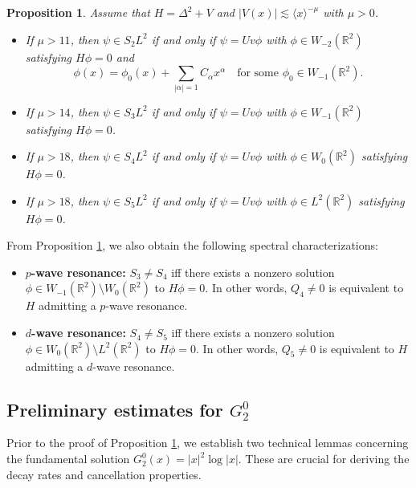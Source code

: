 \documentclass[reqno]{amsart}
\newtheorem{proposition}[theorem]{Proposition}
\numberwithin{equation}{section}
\begin{document}
\begin{proposition}\label{characterizations-1}
	Assume that $H = \Delta^2 + V$ and $|V(x)| \lesssim \langle x \rangle^{-\mu}$ with $\mu > 0$.
	\begin{itemize}
		\item[(i)] If $\mu > 11$, then
		$\psi \in S_{2} L^2$ if and only if $\psi = Uv\phi$ with $\phi \in W_{-2}(\mathbb{R}^2)$ satisfying $H\phi = 0$ and
		\begin{equation}\label{phi-phi0}
			\phi(x) = \phi_0(x) + \sum_{|\alpha|=1} C_\alpha x^\alpha \quad \text{for some } \phi_0 \in W_{-1}(\mathbb{R}^2).
		\end{equation}
		\item[(ii)] If $\mu > 14$, then
		$\psi \in S_{3} L^2$ if and only if $\psi = Uv\phi$ with $\phi \in W_{-1}(\mathbb{R}^2)$ satisfying $H\phi = 0$.
		\item[(iii)] If $\mu > 18$, then
		$\psi \in S_{4} L^2$ if and only if $\psi = Uv\phi$ with $\phi \in W_{0}(\mathbb{R}^2)$ satisfying $H\phi = 0$.
		\item[(iv)] If $\mu > 18$, then
		$\psi \in S_{5} L^2$ if and only if $\psi = Uv\phi$ with $\phi \in L^2(\mathbb{R}^2)$ satisfying $H\phi = 0$.
	\end{itemize}
\end{proposition}
From Proposition \ref{characterizations-1}, we also obtain the following  spectral characterizations:
\begin{itemize}
\item \textbf{$p$-wave resonance:} $S_3 \neq S_4$ iff there exists a nonzero solution $\phi \in W_{-1}(\mathbb{R}^2) \setminus W_{0}(\mathbb{R}^2)$ to $H\phi = 0$. In other words, $Q_4 \neq 0$ is  equivalent to  $H$ admitting a $p$-wave resonance.
	
	\item \textbf{$d$-wave resonance:} $S_4 \neq S_5$ iff there exists a nonzero solution $\phi \in W_{0}(\mathbb{R}^2) \setminus L^2(\mathbb{R}^2)$ to $H\phi = 0$. In other words, $Q_5 \neq 0$ is  equivalent to  $H$ admitting a $d$-wave resonance.
\end{itemize}


\subsection{Preliminary estimates for $G_2^0$}
Prior to the proof of Proposition \ref{characterizations-1}, we establish two technical lemmas concerning  the fundamental solution $G_2^0(x) = |x|^2 \log |x|$. These are crucial for deriving the decay rates and cancellation properties.
\end{document}

